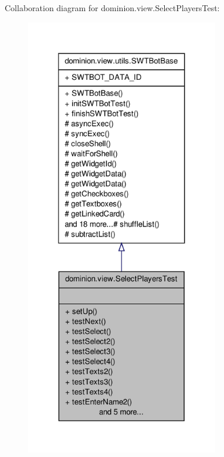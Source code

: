\-Collaboration diagram for dominion.\-view.\-Select\-Players\-Test\-:
\nopagebreak
\begin{figure}[H]
\begin{center}
\leavevmode
\includegraphics[height=550pt]{classdominion_1_1view_1_1SelectPlayersTest__coll__graph}
\end{center}
\end{figure}

